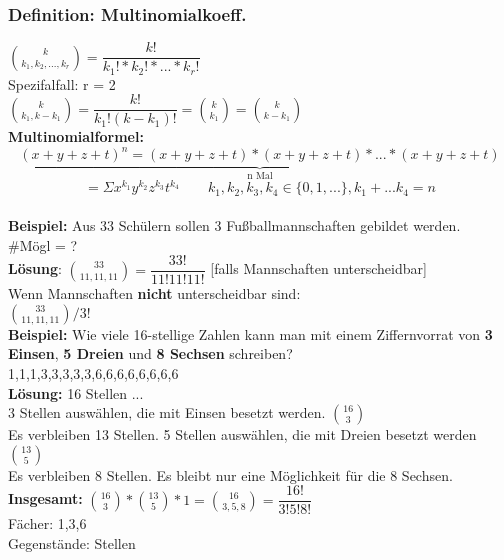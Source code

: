  	\subsubsection{Definition: Multinomialkoeff.}
 	$\binom{k}{k_1,k_2,...,k_r} = \dfrac{k!}{k_1!*k_2!*...*k_r!}$\medskip\\
 	Spezifalfall: r = 2\\
 	$\binom{k}{k_1,k-k_1}=\dfrac{k!}{k_1!(k-k_1)!} = \binom{k}{k_1}= \binom{k}{k-k_1}$\medskip\\
 	\textbf{Multinomialformel: } $$\underbrace{(x+y+z+t)^n = (x+y+z+t)*(x+y+z+t)*...*(x+y+z+t)}_\text{n Mal}$$ 
 	 $$=\Sigma x^{k_1}y^{k_2}z^{k_3}t^{k_4} \qquad k_1, k_2, k_3, k_4 \in \{0,1,...\}, k_1 + ... k_4 = n$$\medskip\\
 	 \textbf{Beispiel:} Aus 33 Schülern sollen 3 Fußballmannschaften gebildet werden.\\
 	 \#Mögl = ?\medskip\\
 	 \textbf{Lösung}: $\binom{33}{11,11,11}= \dfrac{33!}{11!11!11!}$ [falls Mannschaften unterscheidbar]\medskip\\
 	 Wenn Mannschaften \textbf{nicht} unterscheidbar sind:\\
 	 $\binom{33}{11,11,11}/3!$\bigskip\\
 	 \textbf{Beispiel:} Wie viele 16-stellige Zahlen kann man mit einem Ziffernvorrat von \textbf{3 Einsen}, \textbf{5 Dreien} und \textbf{8 Sechsen} schreiben? \medskip\\
 	 1,1,1,3,3,3,3,3,6,6,6,6,6,6,6,6\medskip\\
 	 \textbf{Lösung:} 16 Stellen \qedsymbol \qedsymbol \qedsymbol ... \qedsymbol\\
 	 3 Stellen auswählen, die mit Einsen besetzt werden. $\binom{16}{3}$\\
 	 Es verbleiben 13 Stellen. 5 Stellen auswählen, die mit Dreien besetzt werden $\binom{13}{5}$\\
 	 Es verbleiben 8 Stellen. Es bleibt nur eine Möglichkeit für die 8 Sechsen.\medskip\\
 	 \textbf{Insgesamt:} $\binom{16}{3}*\binom{13}{5}*1 = \binom{16}{3,5, 8} = \dfrac{16!}{3!5!8!}$\smallskip\\
 	 Fächer: 1,3,6\\
 	 Gegenstände: Stellen
